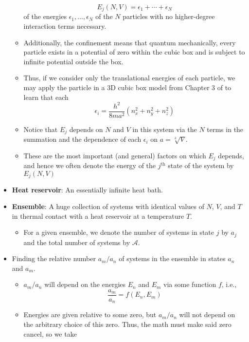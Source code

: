\documentclass[../notes.tex]{subfiles}
\begin{document}
\begin{itemize}
\begin{itemize}
\begin{equation*}
            E_j(N,V) = \epsilon_1+\cdots+\epsilon_N
        \end{equation*}
        of the energies $\epsilon_1,\dots,\epsilon_N$ of the $N$ particles with no higher-degree interaction terms necessary.
        \item Additionally, the confinement means that quantum mechanically, every particle exists in a potential of zero within the cubic box and is subject to infinite potential outside the box.
        \item Thus, if we consider only the translational energies of each particle, we may apply the particle in a 3D cubic box model from Chapter 3 of \textcite{bib:McQuarrieSimon} to learn that each
        \begin{equation*}
            \epsilon_i = \frac{h^2}{8ma^2}(n_x^2+n_y^2+n_z^2)
        \end{equation*}
        \item Notice that $E_j$ depends on $N$ and $V$ in this system via the $N$ terms in the summation and the dependence of each $\epsilon_i$ on $a=\sqrt[3]{V}$.
        \item These are the most important (and general) factors on which $E_j$ depends, and hence we often denote the energy of the $j^\text{th}$ state of the system by $E_j(N,V)$
    \end{itemize}
    \item \textbf{Heat reservoir}: An essentially infinite heat bath.
    \item \textbf{Ensemble}: A huge collection of systems with identical values of $N$, $V$, and $T$ in thermal contact with a heat reservoir at a temperature $T$.
    \begin{itemize}
        \item For a given ensemble, we denote the number of systems in state $j$ by $a_j$ and the total number of systems by $\mathcal{A}$.
    \end{itemize}
    \item Finding the relative number $a_m/a_n$ of systems in the ensemble in states $a_n$ and $a_m$.
    \begin{itemize}
        \item $a_m/a_n$ will depend on the energies $E_n$ and $E_m$ via some function $f$, i.e.,
        \begin{equation*}
            \frac{a_m}{a_n} = f(E_n,E_m)
        \end{equation*}
        \item Energies are given relative to some zero, but $a_m/a_n$ will not depend on the arbitrary choice of this zero. Thus, the math must make said zero cancel, so we take

\end{itemize}
\end{itemize}
\end{document}
